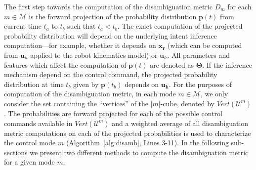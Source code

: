 \documentclass[conference]{IEEEtran}
\begin{document}
The first step towards the computation of the disambiguation metric $D_m$ for each $m \in \mathcal{M}$ is the forward projection of the probability distribution $\boldsymbol{p}(t)$ from current time $t_a$ to $t_b$ such that $t_a < t_b$. The exact computation of the projected probability distribution will depend on the underlying intent inference computation---for example, whether it depends on $\boldsymbol{x_r}$ (which can be computed from $\boldsymbol{u}_h$ applied to the robot kinematics model) or $\boldsymbol{u}_h$. All parameters and features which affect the computation of $\boldsymbol{p}(t)$ are denoted as $\boldsymbol{\Theta}$. If the inference mechanism depend on the control command, the projected probability distribution at time $t_b$ given by $\boldsymbol{p}(t_b)$ depends on $\boldsymbol{u_h}$. For the purposes of computation of the disambiguation metric, in each mode $m \in \mathcal{M}$, we only consider the set containing the ``vertices'' of the $\vert m \vert$-cube, denoted by $Vert(\mathcal{U}^m)$. The probabilities are forward projected for each of the possible control commands available in $Vert(\mathcal{U}^m)$ and a weighted average of all disambiguation metric computations on each of the projected probabilities is used to characterize the control mode $m$ (Algorithm~\ref{alg:disamb}, Lines 3-11). In the following sub-sections we present two different methods to compute the disambiguation metric for a given mode $m$. 
\end{document}
